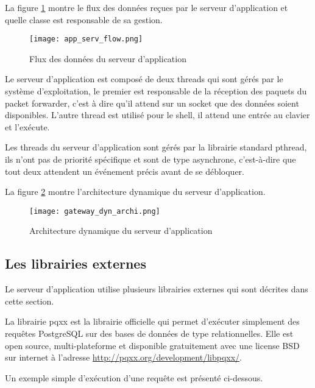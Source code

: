 
La figure \ref{fig:app_serv_flow} montre le flux des données reçues par le serveur d'application et quelle classe est responsable de sa gestion.

\begin{figure}[htb]
\centering 
\texttt{[image: app\_serv\_flow.png]} 
\caption{Flux des données du serveur d'application}
\label{fig:app_serv_flow}
\end{figure}

Le serveur d'application est composé de deux threads qui sont gérés par le système d'exploitation, le premier est responsable de la réception des paquets du packet forwarder, c'est à dire qu'il attend sur un socket que des données soient disponibles. L'autre thread est utilisé pour le shell, il attend une entrée au clavier et l'exécute.

Les threads du serveur d'application sont gérés par la librairie standard pthread, ils n'ont pas de priorité spécifique et sont de type asynchrone, c'est-à-dire que tout deux attendent un événement précis avant de se débloquer.

La figure \ref{fig:gateway_dyn_archi} montre l'architecture dynamique du serveur d'application. 

\begin{figure}[htb]
\centering 
\texttt{[image: gateway\_dyn\_archi.png]} 
\caption{Architecture dynamique du serveur d'application}
\label{fig:gateway_dyn_archi}
\end{figure}

\subsection{Les librairies externes}

Le serveur d'application utilise plusieurs librairies externes qui sont décrites dans cette section.

La librairie pqxx est la librairie officielle qui permet d'exécuter simplement des requêtes PostgreSQL sur des bases de données de type relationnelles. Elle est open source, multi-plateforme et disponible gratuitement avec une license BSD sur internet à l'adresse \url{http://pqxx.org/development/libpqxx/}.

Un exemple simple d'exécution d'une requête est présenté ci-dessous.

